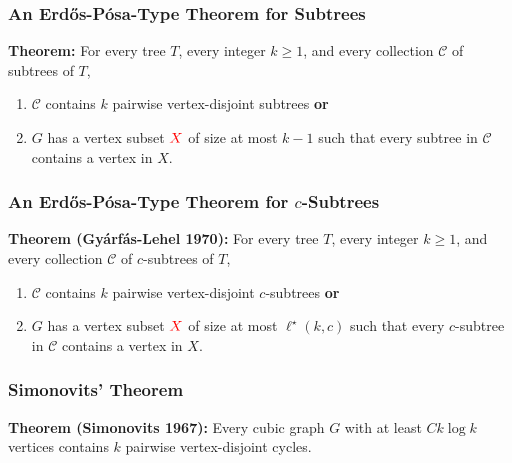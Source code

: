 \documentclass{beamer}
\begin{document}
\begin{frame}
  \frametitle{An Erdős-Pósa-Type Theorem for Subtrees}

  \noindent\textbf{Theorem:} For every tree $T$, every integer $k\ge 1$,  and every collection $\mathcal{C}$ of subtrees of $T$,
  \begin{enumerate}%
    \item $\mathcal{C}$ contains $k$ pairwise vertex-disjoint subtrees \textbf{or}
    \item $G$ has a vertex subset $\mathcolor{red}{X}$ of size at most $k-1$ such that every subtree in $\mathcal{C}$ contains a vertex in $X$.
  \end{enumerate}
\end{frame}


\begin{frame}
  \frametitle{An Erdős-Pósa-Type Theorem for $c$-Subtrees}


  \noindent\textbf{Theorem (Gyárfás-Lehel 1970):} For every tree $T$, every integer $k\ge 1$, and every collection $\mathcal{C}$ of $c$-subtrees of $T$,
  \begin{enumerate}%
    \item $\mathcal{C}$ contains $k$ pairwise vertex-disjoint $c$-subtrees \textbf{or}
    \item $G$ has a vertex subset $\mathcolor{red}{X}$ of size at most $\ell^\star(k,c)$ such that every $c$-subtree in $\mathcal{C}$ contains a vertex in $X$.
  \end{enumerate}
\end{frame}


\begin{frame}
  \frametitle{Simonovits' Theorem}


  \noindent\textbf{Theorem (Simonovits 1967):} Every cubic graph $G$ with at least $C k\log k$ vertices contains $k$ pairwise vertex-disjoint cycles.
\end{frame}
\end{document}
